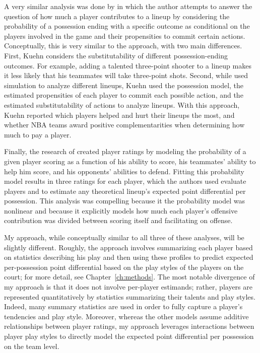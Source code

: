 A very similar analysis was done by \citet{Kuehn} in which the author attempts to
answer the question of how much a player contributes to a lineup by considering the
probability of a possession ending with a specific outcome as conditional on the
players involved in the game and their propensities to commit certain actions.
Conceptually, this is very similar to the \citeauthor{Maymin} approach, with two
main differences. First, Kuehn considers the substitutability of different
possession-ending outcomes. For example, adding a talented three-point shooter to a
lineup makes it less likely that his teammates will take three-point shots. Second,
while \citeauthor{Maymin} used simulation to analyze different lineups, Kuehn used
the possession model, the estimated propensities of each player to commit each
possible action, and the estimated substitutability of actions to analyze lineups.
With this approach, Kuehn reported which players helped and hurt their lineups the
most, and whether NBA teams award positive complementarities when determining how
much to pay a player.

Finally, the research of \citet{Arcidiacono} created player ratings by modeling the
probability of a given player scoring as a function of his ability to score, his
teammates' ability to help him score, and his opponents' abilities to defend.
Fitting this probability model results in three ratings for each player, which the
authors used evaluate players and to estimate any theoretical lineup's expected
point differential per possession. This analysis was compelling because it the
probability model was nonlinear and because it explicitly models how much each
player's offensive contribution was divided between scoring itself and facilitating
on offense.

My approach, while conceptually similar to all three of these analyses, will be
slightly different. Roughly, the approach involves summarizing each player based on
statistics describing his play and then using these profiles to predict expected
per-possession point differential based on the play styles of the players on the
court; for more detail, see Chapter~\ref{ch:methods}. The most notable divergence of
my approach is that it does not involve per-player estimands; rather, players are
represented quantitatively by statistics summarizing their talents and play styles.
Indeed, many summary statistics are used in order to fully capture a player's
tendencies and play style. Moreover, whereas the other models assume additive
relationships between player ratings, my approach leverages interactions
between player play styles to directly model the expected point differential per
possession on the team level.
